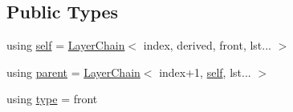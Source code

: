 \subsection*{Public Types}
\begin{DoxyCompactItemize}
\item 
using \hyperlink{structBC_1_1NN_1_1LayerChain_3_01index_00_01derived_00_01front_00_01lst_8_8_8_01_4_a499a7fa03d935cdffd2f53e4f290a657}{self} = \hyperlink{structBC_1_1NN_1_1LayerChain}{Layer\+Chain}$<$ index, derived, front, lst... $>$
\item 
using \hyperlink{structBC_1_1NN_1_1LayerChain_3_01index_00_01derived_00_01front_00_01lst_8_8_8_01_4_ab570a55e09679bd360529850e85b3054}{parent} = \hyperlink{structBC_1_1NN_1_1LayerChain}{Layer\+Chain}$<$ index+1, \hyperlink{structBC_1_1NN_1_1LayerChain_3_01index_00_01derived_00_01front_00_01lst_8_8_8_01_4_a499a7fa03d935cdffd2f53e4f290a657}{self}, lst... $>$
\item 
using \hyperlink{structBC_1_1NN_1_1LayerChain_3_01index_00_01derived_00_01front_00_01lst_8_8_8_01_4_a2ff54527ca6ec72ad9d4a8d7307f8339}{type} = front
\end{DoxyCompactItemize}
